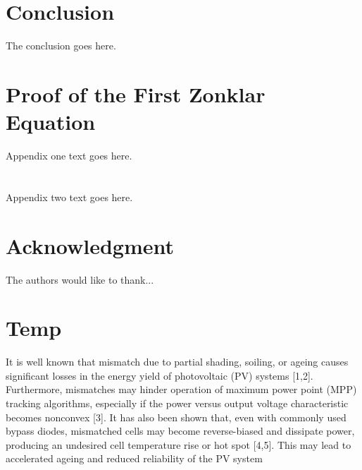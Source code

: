 \documentclass[journal]{IEEEtran}
\begin{document}
\section{Conclusion}
The conclusion goes here.



\appendices
\section{Proof of the First Zonklar Equation}
Appendix one text goes here.

\section{}
Appendix two text goes here.


\section*{Acknowledgment}


The authors would like to thank...


\section*{Temp}
It is well known that mismatch due to partial shading, soiling, or ageing causes significant losses
in the energy yield of photovoltaic (PV) systems [1,2]. Furthermore, mismatches may hinder operation
of maximum power point (MPP) tracking algorithms, especially if the power versus output voltage
characteristic becomes nonconvex [3]. It has also been shown that, even with commonly used bypass
diodes, mismatched cells may become reverse-biased and dissipate power, producing an undesired
cell temperature rise or hot spot [4,5]. This may lead to accelerated ageing and reduced reliability of
the PV system




\end{document}
